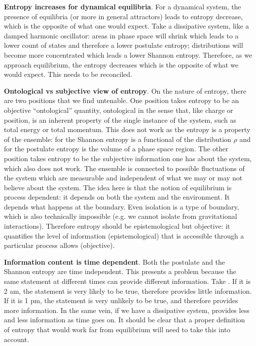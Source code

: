 \documentclass[10pt, onecolumn, longbibliography, nofootinbib]{revtex4-2}
\begin{document}
\textbf{Entropy increases for dynamical equilibria}. For a dynamical system, the presence of equilibria (or more in general attractors) leads to entropy decrease, which is the opposite of what one would expect. Take a dissipative system, like a damped harmonic oscillator: areas in phase space will shrink which leads to a lower count of states and therefore a lower postulate entropy; distributions will become more concentrated which leads a lower Shannon entropy. Therefore, as we approach equilibrium, the entropy decreases which is the opposite of what we would expect. This needs to be reconciled.

\textbf{Ontological vs subjective view of entropy}. On the nature of entropy, there are two positions that we find untenable. One position takes entropy to be an objective ``ontological'' quantity, ontological in the sense that, like charge or position, is an inherent property of the single instance of the system, such as total energy or total momentum. This does not work as the entropy is a property of the ensemble: for the Shannon entropy is a functional of the distribution $\rho$ and for the postulate entropy is the volume of a phase space region. The other position takes entropy to be the subjective information one has about the system, which also does not work. The ensemble is connected to possible fluctuations of the system which are measurable and independent of what we may or may not believe about the system. The idea here is that the notion of equilibrium is process dependent: it depends on both the system and the environment. It depends what happens at the boundary. Even isolation is a type of boundary, which is also technically impossible (e.g. we cannot isolate from gravitational interactions). Therefore entropy should be epistemological but objective: it quantifies the level of information (epistemological) that is accessible through a particular process allows (objective).

\textbf{Information content is time dependent}. Both the postulate and the Shannon entropy are time independent. This presents a problem because the same statement at different times can provide different information. Take . If it is 2 am, the statement is very likely to be true, therefore provides little information. If it is 1 pm, the statement is very unlikely to be true, and therefore provides more information. In the same vein, if we have a dissipative system,  provides less and less information as time goes on. It should be clear that a proper definition of entropy that would work far from equilibrium will need to take this into account.
\end{document}
